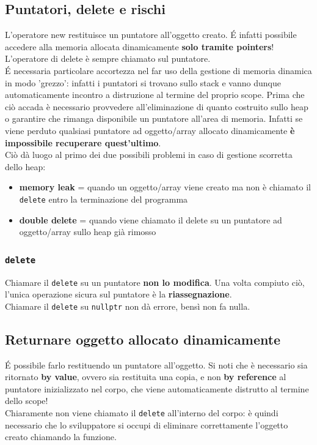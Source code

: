 \documentclass[10pt, oneside]{book}
\begin{document}
\subsection{Puntatori, delete e rischi}
L'operatore new restituisce un puntatore all'oggetto creato. \'E infatti possibile accedere alla memoria allocata dinamicamente \textbf{solo tramite pointers}!\\
L'operatore di delete è sempre chiamato sul puntatore.\\
\'E necessaria particolare accortezza nel far uso della gestione di memoria dinamica in modo 'grezzo': infatti i puntatori si trovano sullo stack e vanno dunque automaticamente incontro a distruzione al termine del proprio scope. Prima che ciò accada è necessario provvedere all'eliminazione di quanto costruito sullo heap o garantire che rimanga disponibile un puntatore all'area di memoria. Infatti se viene perduto qualsiasi puntatore ad oggetto/array allocato dinamicamente \textbf{è impossibile recuperare quest'ultimo}.\\
Ciò dà luogo al primo dei due possibili problemi in caso di gestione scorretta dello heap:
\begin{itemize}
\item \textbf{memory leak} = quando un oggetto/array viene creato ma non è chiamato il \texttt{delete} entro la terminazione del programma
\item \textbf{double delete} = quando viene chiamato il delete su un puntatore ad oggetto/array sullo heap già rimosso
\end{itemize}

\subsubsection{\texttt{delete}}
Chiamare il \texttt{delete} su un puntatore \textbf{non lo modifica}. Una volta compiuto ciò, l'unica operazione sicura sul puntatore è la \textbf{riassegnazione}. \\
Chiamare il \texttt{delete} su \texttt{nullptr} non dà errore, bensì non fa nulla.

\subsection{Returnare oggetto allocato dinamicamente}
\'E possibile farlo restituendo un puntatore all'oggetto. Si noti che è necessario sia ritornato \textbf{by value}, ovvero sia restituita una copia, e non \textbf{by reference} al puntatore inizializzato nel corpo, che viene automaticamente distrutto al termine dello scope!\\
Chiaramente non viene chiamato il \texttt{delete} all'interno del corpo: è quindi necessario che lo sviluppatore si occupi di eliminare correttamente l'oggetto creato chiamando la funzione.
\end{document}
